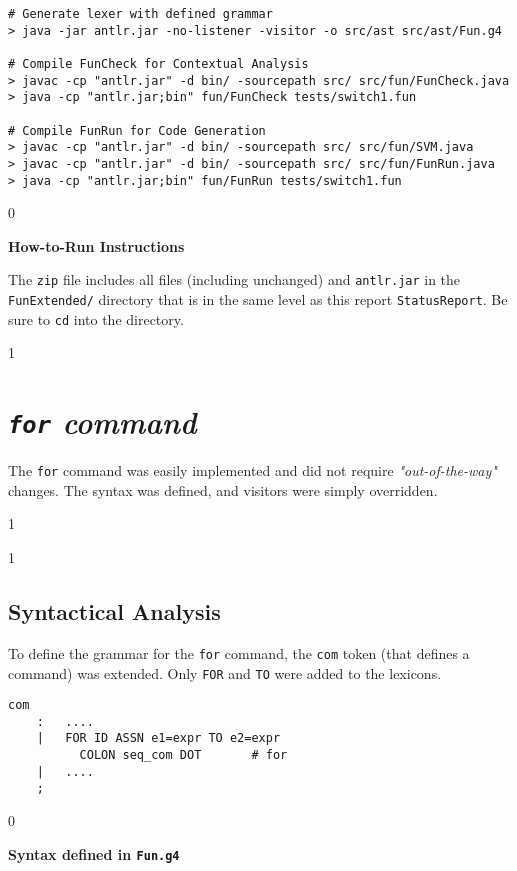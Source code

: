 \documentclass{article}
\newcommand{\code}[1]{\texttt{#1}}
\newenvironment{codelst}{\captionsetup{type=listing}}{}
\newcommand{\showdetails}{1}
\newcommand{\dividestages}{0}
\newcommand{\npage}{
    \if\dividestages1
        \newpage
    \fi
}
\newcommand{\stage}[1]{
    \if\dividestages1
        \vspace{0.5cm}
        \subsection{#1}
    \fi
}
\newcommand{\codecaption}[1]{
    \if\dividestages0
        \vspace{-0.75cm}
        \caption{\textbf{#1}}
        \vspace{0.4cm}
    \fi
}
\begin{document}
\begin{codelst}
\begin{verbatim}
# Generate lexer with defined grammar
> java -jar antlr.jar -no-listener -visitor -o src/ast src/ast/Fun.g4

# Compile FunCheck for Contextual Analysis
> javac -cp "antlr.jar" -d bin/ -sourcepath src/ src/fun/FunCheck.java
> java -cp "antlr.jar;bin" fun/FunCheck tests/switch1.fun

# Compile FunRun for Code Generation
> javac -cp "antlr.jar" -d bin/ -sourcepath src/ src/fun/SVM.java
> javac -cp "antlr.jar" -d bin/ -sourcepath src/ src/fun/FunRun.java
> java -cp "antlr.jar;bin" fun/FunRun tests/switch1.fun
\end{verbatim}
\codecaption{How-to-Run Instructions}
\end{codelst}

\fi

\vspace{0.5cm}

\noindent The \code{zip} file includes all files (including unchanged) and \code{antlr.jar} in the \code{FunExtended/} directory that is in the same level as this report \code{StatusReport}. Be sure to \code{cd} into the directory.



\npage

\section{\textit{\code{for} command}}

\noindent The \code{for} command was easily implemented and did not require \textit{"out-of-the-way"} changes. The syntax was defined, and visitors were simply overridden.

\if\showdetails1


\stage{Syntactical Analysis}

\noindent To define the grammar for the \code{for} command, the \code{com} token (that defines a command) was extended. Only \code{FOR} and \code{TO} were added to the lexicons.

\begin{codelst}
\begin{verbatim}
com
    :   ....
    |   FOR ID ASSN e1=expr TO e2=expr
          COLON seq_com DOT		  # for
    |   ....
    ;
\end{verbatim}
\codecaption{Syntax defined in \code{Fun.g4}}
\end{codelst}
\end{document}
